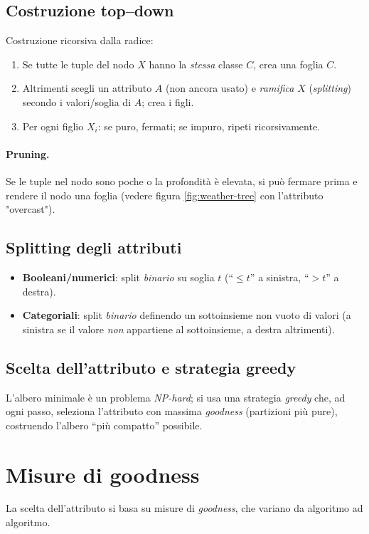 \subsection{Costruzione top–down}\label{subsec:topdown}
Costruzione ricorsiva dalla radice:
\begin{enumerate}
  \item Se tutte le tuple del nodo $X$ hanno la \emph{stessa} classe $C$, crea una foglia $C$.
  \item Altrimenti scegli un attributo $A$ (non ancora usato) e \emph{ramifica} $X$ (\emph{splitting}) secondo i valori/soglia di $A$; crea i figli.
  \item Per ogni figlio $X_i$: se puro, fermati; se impuro, ripeti ricorsivamente.
\end{enumerate}

\paragraph{Pruning.}
Se le tuple nel nodo sono poche o la profondità è elevata, si può fermare prima e rendere il nodo una foglia (vedere figura \ref{fig:weather-tree} con l'attributo "overcast").

\subsection{Splitting degli attributi}\label{subsec:splitting}
\begin{itemize}
  \item \textbf{Booleani/numerici}: split \emph{binario} su soglia $t$ (``$\le t$'' a sinistra, ``$>t$'' a destra).
  \item \textbf{Categoriali}: split \emph{binario} definendo un sottoinsieme non vuoto di valori (a sinistra se il valore \emph{non} appartiene al sottoinsieme, a destra altrimenti).
\end{itemize}

\subsection{Scelta dell’attributo e strategia greedy}\label{subsec:greedy}
L’albero minimale è un problema \emph{NP-hard}; si usa una strategia \emph{greedy} che, ad ogni passo, seleziona l’attributo con massima \emph{goodness} (partizioni più pure),
costruendo l’albero “più compatto” possibile.

\section{Misure di goodness}\label{sec:goodness}
La scelta dell’attributo si basa su misure di \emph{goodness}, che variano da algoritmo ad algoritmo.

